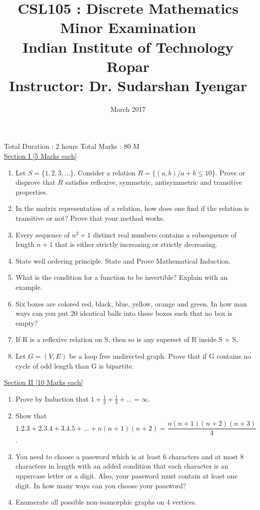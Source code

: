 \documentclass{article}
\title{CSL105 : Discrete Mathematics\\
\large{Minor Examination}\\
\large{Indian Institute of Technology Ropar}\\
\small{Instructor: Dr. Sudarshan Iyengar}
}
\date{March 2017}
\begin{document}
\maketitle
Total Duration : 2 hours \hfill Total Marks : 80 M\\

\underline{\large{Section I \hspace*{7cm} [5 Marks each]}}
\begin{enumerate} 
    \item Let $S=\{1,2,3,\dots\}$. Consider a relation $R=\{(a,b)/a+b\leq 10\}$. Prove or disprove that $R$ satisfies reflexive, symmetric, antisymmetric and transitive properties. 
    \item In the matrix representation of a relation, how does one find if the relation is transitive or not? Prove that your method works.  
    \item Every sequence of $n^2 + 1$ distinct real numbers contains a subsequence of length $n + 1$ that is either strictly increasing or strictly decreasing. 
    \item State well ordering principle. State and Prove Mathematical Induction.
    \item What is the condition for a function to be invertible? Explain with an example. 
    \item Six boxes are colored red, black, blue, yellow, orange and green. In how man ways can you
put 20 identical balls into these boxes such that no box is empty?
    \item If R is a reflexive relation on S, then so is any superset of R inside S × S.
    \item Let $G = (V, E)$ be a loop free undirected graph. Prove that if G contains no cycle of odd
length than G is bipartite.

\end{enumerate}
\vspace*{3.5cm}


\underline{\large{Section II \hspace*{7cm} [10 Marks each]}}
\begin{enumerate} 
 \item Prove by Induction that $1+\frac{1}{2}+\frac{1}{3}+\dots=\infty$.
 \item Show that $$1.2.3+2.3.4+3.4.5+\dots +n(n+1)(n+2)= \frac{n(n+1)(n+2)(n+3)}{4}$$. 
 \item You need to choose a password which is at least 6 characters and at most 8 characters in length with an added condition that each character is an uppercase letter or a digit. Also, your password must contain at least one digit. In how many ways can you choose your password? 
 \item Enumerate all possible non-isomorphic graphs on 4 vertices. 

\end{enumerate}
\end{document}
